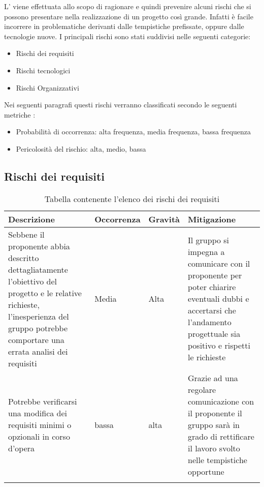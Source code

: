 \documentclass[../piano_di_progetto.tex]{subfiles}
\begin{document}
L’  viene effettuata allo scopo di ragionare e quindi prevenire alcuni rischi che si possono presentare nella realizzazione di un progetto così grande. Infatti è facile incorrere in problematiche derivanti dalle tempistiche prefissate, oppure dalle tecnologie nuove.
I principali rischi sono stati suddivisi nelle seguenti categorie:
\begin{itemize}
\item Rischi dei requisiti 
\item Rischi tecnologici 
\item Rischi Organizzativi
\end{itemize}
Nei seguenti paragrafi questi rischi verranno classificati secondo le seguenti metriche :
\begin{itemize}
\item Probabilità di occorrenza: alta frequenza, media frequenza, bassa frequenza
\item Pericolosità del rischio: alta, medio, bassa
\end{itemize}

\subsection{Rischi dei requisiti}%
\label{sub:rischi_req}

\begin{center}
	\begin{longtable}{|p{3.5cm}|p{2cm}|p{2cm}|p{3.5cm}|}
		\hline
		\rowcolor{lightgray}
		{\textbf{Descrizione}} & {\textbf{Occorrenza}} & {\textbf{Gravità}} & {\textbf{Mitigazione}} \\

		\hline
			Sebbene il proponente abbia descritto dettagliatamente l’obiettivo del progetto e le relative richieste, l’inesperienza del gruppo potrebbe comportare una errata analisi dei requisiti
			&
			Media
			& 
			Alta
			&
			Il gruppo si impegna a comunicare con il proponente per poter chiarire eventuali dubbi e accertarsi che l’andamento progettuale sia positivo e rispetti le richieste\\
			
			\hline
			Potrebbe verificarsi una modifica dei requisiti minimi o opzionali in corso d’opera
			&
			bassa
			& 
			alta
			& 
			Grazie ad una regolare comunicazione con il proponente il gruppo sarà in grado di rettificare il lavoro svolto nelle tempistiche opportune\\
			\hline
\caption{Tabella contenente l'elenco dei rischi dei requisiti}
	\end{longtable}

\end{center}
\end{document}
